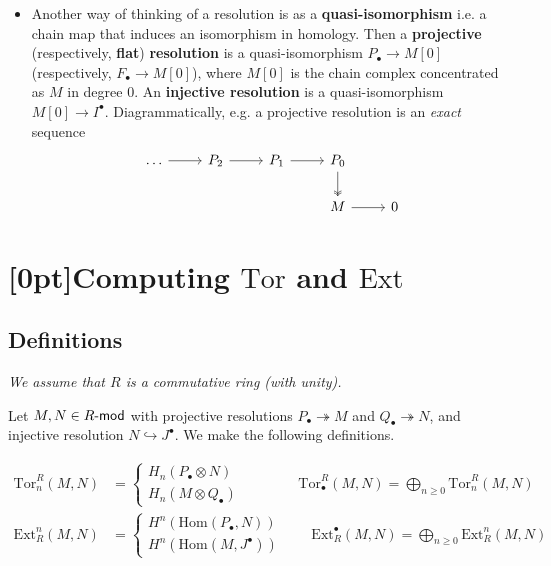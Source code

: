 \documentclass[10pt]{article}
\newcommand{\HA}{\textcolor{cyan}{HA}}
\newcommand{\AT}{\textcolor{violet}{AT}}
\begin{document}
\begin{itemize}
\begin{equation*}
                \end{equation*}
            \item Another way of thinking of a resolution is as a \textbf{quasi-isomorphism} i.e. a chain map that induces an isomorphism in homology.
                Then a \textbf{projective} (respectively, \textbf{flat}) \textbf{resolution} is a quasi-isomorphism $P_\bullet\to M[0]$ (respectively, $F_\bullet\to M[0]$), where $M[0]$ is the chain complex concentrated as $M$ in degree $0$.
                An \textbf{injective resolution} is a quasi-isomorphism $M[0]\to I^\bullet$.
                Diagrammatically, e.g. a projective resolution is an \emph{exact} sequence
                \begin{equation*}
                    \begin{tikzcd}
                        \ldots \rar & P_2 \rar & P_1 \rar & P_0 \ar[two heads]{d} &\\
                        & & & M \rar & 0
                    \end{tikzcd}
                \end{equation*}
        \end{itemize}

    \section{\protect\marginnote{\HA~\AT}[0pt]Computing $\mathrm{Tor}$ and $\mathrm{Ext}$}

        \subsection{Definitions}

            \emph{We assume that $R$ is a commutative ring (with unity).}

            Let $M,N\in R\hbox{-}\mathsf{mod}$ with projective resolutions
            $P_\bullet\twoheadrightarrow M$ and $Q_\bullet\twoheadrightarrow N$,
            and injective resolution $N\hookrightarrow J^\bullet$. We make the
            following definitions.

            \begin{align*}
                \mathrm{Tor}_n^R(M,N)&=
                \begin{cases}
                    H_n(P_\bullet\otimes N)\\
                    H_n(M\otimes Q_\bullet)
                \end{cases}\qquad\qquad
                \mathrm{Tor}_\bullet^R(M,N)=\bigoplus_{n\geqslant0}\mathrm{Tor}_n^R(M,N)\\[2em]
                \mathrm{Ext}_R^n(M,N)&=
                \begin{cases}
                    H^n(\mathrm{Hom}(P_\bullet,N))\\
                    H^n(\mathrm{Hom}(M,J^\bullet))
                \end{cases}\qquad
                \mathrm{Ext}_R^\bullet(M,N)=\bigoplus_{n\geqslant0}\mathrm{Ext}_R^n(M,N)
            \end{align*}
\end{document}
